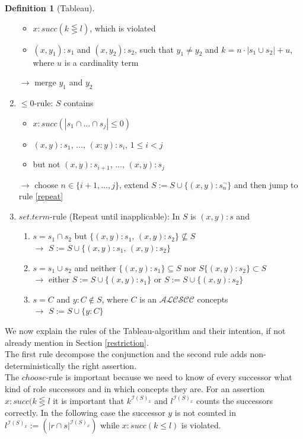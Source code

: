 \documentclass[a4paper,11pt]{scrartcl}
\theoremstyle{break}
\theoremstyle{definition}
\newtheorem{mydef}{Definition}
\begin{document}
\begin{mydef}[Tableau]
\begin{enumerate}
\begin{itemize}
\item $x:succ(k\lesseqgtr l)$, which is violated
\item $(x,y_1):s_1$ and $(x,y_2):s_2$, such that $y_1\neq y_2$ and $k=n\cdot |s_1\cup s_2|+u$, where $u$ is a cardinality term
\end{itemize}
$\rightarrow$ merge $y_1$ and $y_2$ 
\item\label{s}$\leq 0$-rule: $S$ contains 
\begin{itemize}
\item $x:succ(|s_1\cap\dots\cap s_j|\leq 0)$
\item $(x,y):s_1$, $\dots$, $(x:y):s_i$, $1\leq i<j$
\item but not $(x,y):s_{i+1}$, $\dots$, $(x,y):s_j$
\end{itemize}
$\rightarrow$ choose $n\in\{i+1,\dots, j\}$, extend $S:=S\cup\{(x,y):s_n^\neg\}$ and then jump to rule \ref{repeat}
\item\label{repeat} $set.term$-rule (Repeat until inapplicable): In $S$ is $(x,y):s$ and
\begin{enumerate}
\item\label{setterm1} $s=s_1\cap s_2$ but $\{(x,y):s_1,\,(x,y):s_2\}\not\subseteq S$\\
$\rightarrow$ $S:=S\cup \{(x,y):s_1,\,(x,y):s_2\}$ 
\item\label{setterm2} $s=s_1\cup s_2$ and neither $\{(x,y):s_1\}\subseteq S$ nor $S\{(x,y):s_2\}\subset S$\\
$\rightarrow$ either $S:=S\cup \{(x,y):s_1\}$ or $S:=S\cup \{(x,y):s_2\}$ 
\item\label{setterm3} $s=C$ and $y:C\notin S$, where $C$ is an $\mathcal{ALCSCC}$ concepts\\
$\rightarrow$ $S:=S\cup\{y:C\}$
\end{enumerate}
\end{enumerate}
\end{mydef}
We now explain the rules of the Tableau-algorithm and their intention, if not already mention in Section \ref{restriction}.\\
The first rule decompose the conjunction and the second rule adds non-deterministically the right assertion.\\
The $choose$-rule is important because we need to know of every successor what kind of role successors and in which concepts they are. For an assertion $x:succ(k\lesseqgtr l$ it is important that $k^{\mathcal{I}(S)_x}$ and $l^{\mathcal{I}(S)_x}$ counts the successors correctly. In the following case the successor $y$ is not counted in $l^{\mathcal{I}(S)_x}:=(|r\cap s|^{\mathcal{I}(S)_x})$ while $x:succ(k\leq l)$ is violated.
\end{document}
